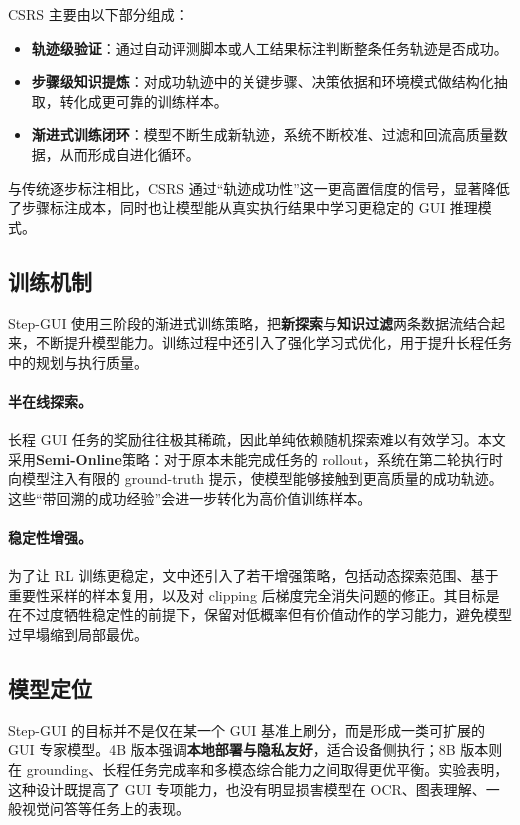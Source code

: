 CSRS 主要由以下部分组成：
\begin{itemize}
\item \textbf{轨迹级验证}：通过自动评测脚本或人工结果标注判断整条任务轨迹是否成功。
\item \textbf{步骤级知识提炼}：对成功轨迹中的关键步骤、决策依据和环境模式做结构化抽取，转化成更可靠的训练样本。
\item \textbf{渐进式训练闭环}：模型不断生成新轨迹，系统不断校准、过滤和回流高质量数据，从而形成自进化循环。
\end{itemize}

与传统逐步标注相比，CSRS 通过“轨迹成功性”这一更高置信度的信号，显著降低了步骤标注成本，同时也让模型能从真实执行结果中学习更稳定的 GUI 推理模式。

\subsection{训练机制}

Step-GUI 使用三阶段的渐进式训练策略，把\textbf{新探索}与\textbf{知识过滤}两条数据流结合起来，不断提升模型能力。训练过程中还引入了强化学习式优化，用于提升长程任务中的规划与执行质量。

\paragraph{半在线探索。}
长程 GUI 任务的奖励往往极其稀疏，因此单纯依赖随机探索难以有效学习。本文采用\textbf{Semi-Online}策略：对于原本未能完成任务的 rollout，系统在第二轮执行时向模型注入有限的 ground-truth 提示，使模型能够接触到更高质量的成功轨迹。这些“带回溯的成功经验”会进一步转化为高价值训练样本。

\paragraph{稳定性增强。}
为了让 RL 训练更稳定，文中还引入了若干增强策略，包括动态探索范围、基于重要性采样的样本复用，以及对 clipping 后梯度完全消失问题的修正。其目标是在不过度牺牲稳定性的前提下，保留对低概率但有价值动作的学习能力，避免模型过早塌缩到局部最优。

\subsection{模型定位}

Step-GUI 的目标并不是仅在某一个 GUI 基准上刷分，而是形成一类可扩展的 GUI 专家模型。4B 版本强调\textbf{本地部署与隐私友好}，适合设备侧执行；8B 版本则在 grounding、长程任务完成率和多模态综合能力之间取得更优平衡。实验表明，这种设计既提高了 GUI 专项能力，也没有明显损害模型在 OCR、图表理解、一般视觉问答等任务上的表现。
